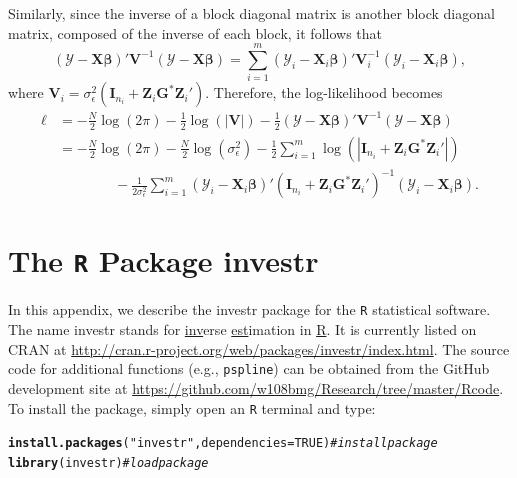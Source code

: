 \documentclass[cmfont,usenames,dvipsnames,leqno]{afit-etd}\usepackage[]{graphicx}\usepackage[]{color}
\makeatletter
\newcommand{\hlnum}[1]{\textcolor[rgb]{0.686,0.059,0.569}{#1}}%
\newcommand{\hlstr}[1]{\textcolor[rgb]{0.192,0.494,0.8}{#1}}%
\newcommand{\hlcom}[1]{\textcolor[rgb]{0.678,0.584,0.686}{\textit{#1}}}%
\newcommand{\hlstd}[1]{\textcolor[rgb]{0.345,0.345,0.345}{#1}}%
\newcommand{\hlkwc}[1]{\textcolor[rgb]{0.333,0.667,0.333}{#1}}%
\newcommand{\hlkwd}[1]{\textcolor[rgb]{0.737,0.353,0.396}{\textbf{#1}}}%
\newenvironment{kframe}{%
 \def\at@end@of@kframe{}%
 \ifinner\ifhmode%
  \def\at@end@of@kframe{\end{minipage}}%
  \begin{minipage}{\columnwidth}%
 \fi\fi%
 \def\FrameCommand##1{\hskip\@totalleftmargin \hskip-\fboxsep
 \colorbox{shadecolor}{##1}\hskip-\fboxsep
     \hskip-\linewidth \hskip-\@totalleftmargin \hskip\columnwidth}%
 \MakeFramed {\advance\hsize-\width
   \@totalleftmargin\z@ \linewidth\hsize
   \@setminipage}}%
 {\par\unskip\endMakeFramed%
 \at@end@of@kframe}
\newenvironment{knitrout}{}{} %
\renewenvironment{knitrout}{\begin{singlespace}}{\end{singlespace}}
\newcommand{\newln}{\\&\quad\quad\quad\quad{}}
\newcommand{\code}[1]{\texttt{\small{#1}}}
\newcommand{\pkg}[1]{\textsf{\small{#1}}}
\makeatother
\begin{document}
Similarly, since the inverse of a block diagonal matrix is another block diagonal matrix, composed of the inverse of each block, it follows that
\begin{equation*}
  \left(\boldsymbol{\mathcal{Y}} - \boldsymbol{X}\boldsymbol{\beta}\right)'\boldsymbol{V}^{-1}\left(\boldsymbol{\mathcal{Y}} - \boldsymbol{X}\boldsymbol{\beta}\right) = \sum_{i=1}^m\left(\boldsymbol{\mathcal{Y}}_i - \boldsymbol{X}_i\boldsymbol{\beta}\right)'\boldsymbol{V}_i^{-1}\left(\boldsymbol{\mathcal{Y}}_i - \boldsymbol{X}_i\boldsymbol{\beta}\right),
\end{equation*}
where $\boldsymbol{V}_i = \sigma_\epsilon^2\left(\boldsymbol{I}_{n_i} + \boldsymbol{Z}_i\boldsymbol{G}^*\boldsymbol{Z}_i'\right)$. Therefore, the log-likelihood becomes
\begin{align*}
    \ell &= -\frac{N}{2}\log(2\pi) - \frac{1}{2}\log\left(\left|\boldsymbol{V}\right|\right) - \frac{1}{2}\left(\boldsymbol{\mathcal{Y}} - \boldsymbol{X}\boldsymbol{\beta}\right)'\boldsymbol{V}^{-1}\left(\boldsymbol{\mathcal{Y}} - \boldsymbol{X}\boldsymbol{\beta}\right) \\
    &= -\frac{N}{2}\log(2\pi) - \frac{N}{2}\log(\sigma_\epsilon^2) - \frac{1}{2}\sum_{i=1}^m\log\left(\left|\boldsymbol{I}_{n_i} + \boldsymbol{Z}_i\boldsymbol{G}^*\boldsymbol{Z}_i'\right|\right) \newln - \frac{1}{2\sigma_\epsilon^2}\sum_{i=1}^m\left(\boldsymbol{\mathcal{Y}}_i - \boldsymbol{X}_i\boldsymbol{\beta}\right)'\left(\boldsymbol{I}_{n_i} + \boldsymbol{Z}_i\boldsymbol{G}^*\boldsymbol{Z}_i'\right)^{-1}\left(\boldsymbol{\mathcal{Y}}_i - \boldsymbol{X}_i\boldsymbol{\beta}\right).
\end{align*}

\chapter{The \code{R} Package \pkg{investr}}
\label{app:investr}
In this appendix, we describe the \pkg{investr} package for the \code{R} statistical software. The name \pkg{investr} stands for \underline{inv}erse \underline{est}imation in \underline{R}. It is currently listed on CRAN at \url{http://cran.r-project.org/web/packages/investr/index.html}. The source code for additional functions (e.g., \code{pspline}) can be obtained from the GitHub development site at \url{https://github.com/w108bmg/Research/tree/master/Rcode}. To install the package, simply open an \code{R} terminal and type:

\begin{knitrout}
\color{fgcolor}\begin{kframe}
\begin{alltt}
\hlkwd{install.packages}\hlstd{(}\hlstr{"investr"}\hlstd{,} \hlkwc{dependencies} \hlstd{=} \hlnum{TRUE}\hlstd{)}  \hlcom{# install package}
\hlkwd{library}\hlstd{(investr)}  \hlcom{# load package}
\end{alltt}
\end{kframe}
\end{knitrout}
\end{document}
